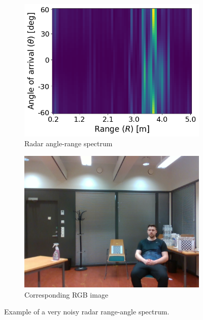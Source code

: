 \begin{figure}[h]
    \centering
    \begin{subfigure}[t]{0.49\textwidth}
        \includegraphics[width=\textwidth]{fig/5/bad-spectrum-example-radar.png}
        \caption{Radar angle-range spectrum}
    \end{subfigure}
    \hfill
    \begin{subfigure}[t]{0.49\textwidth}
        \includegraphics[width=\textwidth]{fig/5/bad-spectrum-example-rgb.png}
        \caption{Corresponding RGB image}
    \end{subfigure}
    \caption{Example of a very noisy radar range-angle spectrum.}
    \label{fig:bad-radar-example}
\end{figure}